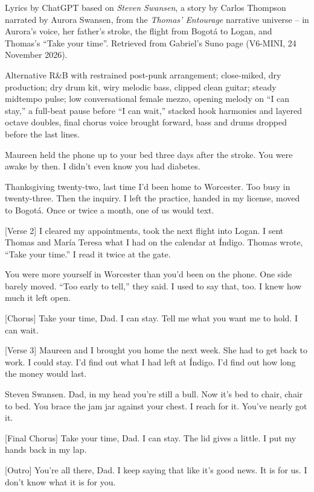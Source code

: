 
\begin{notes}
Lyrics by ChatGPT based on \emph{Steven Swansen}, a story by Carlos Thompson narrated by Aurora Swansen, from the \emph{Thomas' Entourage} narrative universe -- in Aurora's voice, her father's stroke, the flight from Bogotá to Logan, and Thomas's ``Take your time''. Retrieved from Gabriel's Suno page (V6-MINI, 24 November 2026).
\end{notes}
\begin{style}
Alternative R\&B with restrained post-punk arrangement; close-miked, dry production; dry drum kit, wiry melodic bass, clipped clean guitar; steady midtempo pulse; low conversational female mezzo, opening melody on “I can stay,” a full-beat pause before “I can wait,” stacked hook harmonies and layered octave doubles, final chorus voice brought forward, bass and drums dropped before the last lines.
\end{style}
\begin{lyrics}
[Verse 1]
Maureen held the phone up to your bed
three days after the stroke.
You were awake by then.
I didn’t even know you had diabetes.

Thanksgiving twenty-two,
last time I’d been home to Worcester.
Too busy in twenty-three.
Then the inquiry.
I left the practice, handed in my license,
moved to Bogotá.
Once or twice a month,
one of us would text.

[Verse 2]
I cleared my appointments,
took the next flight into Logan.
I sent Thomas and María Teresa
what I had on the calendar at Índigo.
Thomas wrote, “Take your time.”
I read it twice at the gate.

You were more yourself in Worcester
than you’d been on the phone.
One side barely moved.
“Too early to tell,” they said.
I used to say that, too.
I knew how much it left open.

[Chorus]
Take your time, Dad.
I can stay.
Tell me what you want me to hold.
I can wait.

[Verse 3]
Maureen and I brought you home the next week.
She had to get back to work.
I could stay.
I’d find out what I had left at Índigo.
I’d find out how long the money would last.

Steven Swansen.
Dad, in my head you’re still a bull.
Now it’s bed to chair,
chair to bed.
You brace the jam jar against your chest.
I reach for it.
You’ve nearly got it.

[Final Chorus]
Take your time, Dad.
I can stay.
The lid gives a little.
I put my hands back in my lap.

[Outro]
You’re all there, Dad.
I keep saying that like it’s good news.
It is for us.
I don’t know what it is for you.
\end{lyrics}

